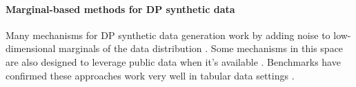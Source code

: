 \paragraph{Marginal-based methods for DP synthetic data}

Many mechanisms for DP synthetic data generation work by adding noise to low-dimensional marginals of the data distribution \cite{mckenna2021winning,mckenna2022aim,cai2021data,aydore2021differentially,fuentes2024joint,vietri2022private,liu2021iterative,liu2021leveraging,zhang2021privsyn}.  Some mechanisms in this space are also designed to leverage public data when it's available \cite{fuentes2024joint,liu2021iterative,liu2021leveraging}.  Benchmarks have confirmed these approaches work very well in tabular data settings \cite{tao2021benchmarking}.



